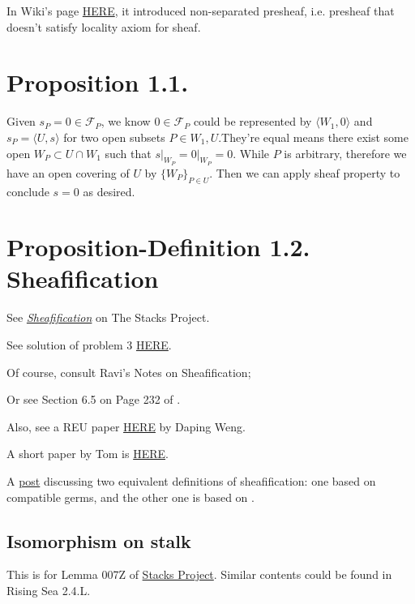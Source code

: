 In Wiki's page \href{https://en.wikipedia.org/wiki/Sheaf_(mathematics)}{HERE}, it introduced non-separated presheaf, i.e. presheaf that doesn't satisfy locality axiom for sheaf.
\section{Proposition 1.1.}

Given $s_P=0\in\mathscr F_P$, we know $0\in \mathscr F_P$ could be represented by $\langle W_1,0\rangle$ and $s_P=\langle U,s\rangle$ for two open subsets $P\in W_1,U$.They're equal means there exist some open $W_P\subset U\cap W_1$ such that $s\vert_{W_P}=0\vert_{W_P}=0$. While $P$ is arbitrary, therefore we have an open covering of $U$ by $\{W_P\}_{P\in U}$. Then we can apply sheaf property to conclude $s=0$ as desired.

\section{Proposition-Definition 1.2. Sheafification}

See \href{https://stacks.math.columbia.edu/tag/007X}{\textit{Sheafification}} on The Stacks Project.

See solution of problem 3 \href{https://www2.math.ethz.ch/education/bachelor/lectures/fs2016/math/alg_geom/Solution11.pdf}{HERE}.

Of course, consult Ravi's Notes on Sheafification; 

Or see Section 6.5 on Page 232 of \cite{bosch2013algebraic}.

Also, see a REU paper \href{http://www.math.uchicago.edu/%7Emay/VIGRE/VIGRE2011/REUPapers/WengD.pdf}{HERE} by Daping Weng.

A short paper by Tom is \href{https://www.maths.ed.ac.uk/~tl/sheaves.pdf}{HERE}.

A \href{https://math.stackexchange.com/questions/889497/sheafification-definition}{post} discussing two equivalent definitions of sheafification: one based on compatible germs, and the other one is based on .

\subsection{Isomorphism on stalk}

This is for Lemma 007Z of \href{https://stacks.math.columbia.edu/tag/007X}{Stacks Project}. Similar contents could be found in Rising Sea 2.4.L.

